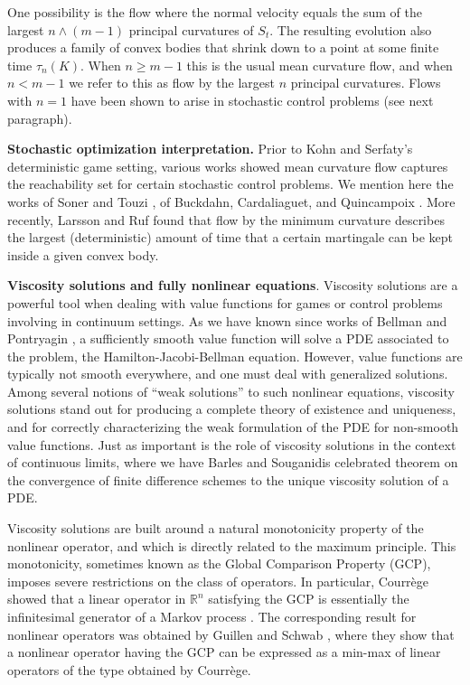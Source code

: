 \documentclass[reqno]{amsart}
\numberwithin{equation}{section}
\begin{document}
  One possibility is the flow where the normal velocity equals the sum of the largest $n\wedge (m-1)$ principal curvatures of $S_t$. The resulting evolution also produces a family of convex bodies that shrink down to a point at some finite time $\tau_{n}(K)$.  When $n\geq m-1$ this is the usual mean curvature flow, and when $n<m-1$ we refer to this as flow by the largest $n$ principal curvatures. Flows with $n=1$ have been shown to arise in stochastic control problems \cite{larsson2024minimum} (see next paragraph).

 
\textbf{Stochastic optimization interpretation.} Prior to Kohn and Serfaty's deterministic game setting, various works showed mean curvature flow captures the reachability set for certain stochastic control problems. We mention here the works of Soner and Touzi \cite{soner2002dynamic,soner2003stochastic}, of Buckdahn, Cardaliaguet, and Quincampoix \cite{buckdahn2001representation}. More recently, Larsson and Ruf \cite{larsson2024minimum} found that flow by the minimum curvature describes the largest (deterministic) amount of time that a certain martingale can be kept inside a given convex body. 


\textbf{Viscosity solutions and fully nonlinear equations}. Viscosity solutions are a powerful tool when dealing with value functions for games or control problems involving in continuum settings. As we have known since works of Bellman\cite{Bellman1957} and  Pontryagin \cite{Pont1985}, a sufficiently smooth value function will solve a PDE associated to the problem, the Hamilton-Jacobi-Bellman equation. However, value functions are typically not smooth everywhere, and one must deal with generalized solutions. Among several notions of ``weak solutions'' to such nonlinear equations, viscosity solutions stand out for producing a complete theory of existence and uniqueness, and for correctly characterizing the weak formulation of the PDE for non-smooth value functions. Just as important is the role of viscosity solutions in the context of continuous limits, where we have Barles and Souganidis \cite{BarSou1991} celebrated theorem on the convergence of finite difference schemes to the unique viscosity solution of a PDE.


Viscosity solutions are built around a natural monotonicity property of the nonlinear operator, and which is directly related to the maximum principle. This monotonicity, sometimes known as the Global Comparison Property (GCP), imposes severe restrictions on the class of operators. In particular, Courr\`ege showed that a linear operator in $\mathbb{R}^n$ satisfying the GCP is essentially the infinitesimal generator of a Markov process \cite{courrege1965}. The corresponding result for nonlinear operators was obtained by Guillen and Schwab \cite{GuiSch2019,GuiSch2020}, where they show that a nonlinear operator having the GCP can be expressed as a min-max of linear operators of the type obtained by Courr\`ege.
\end{document}

